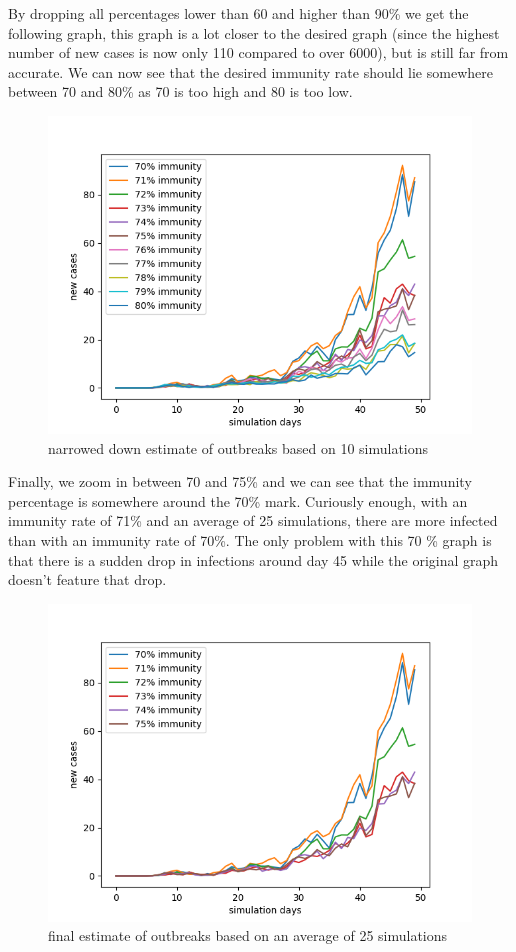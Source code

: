 \documentclass[runningheads]{llncs}
\begin{document}
	\newpage
	\noindent
	By dropping all percentages lower than 60 and higher than 90\% we get the following graph, this graph is a lot closer to the desired graph (since the highest number of new cases is now only 110 compared to over 6000), but is still far from accurate. We can now see that the desired immunity rate should lie somewhere between 70 and 80\% as 70 is too high and 80 is too low.
	\begin{figure}
		\includegraphics[width=\textwidth]{test_immunity_70-80.png}
		\caption{narrowed down estimate of outbreaks based on 10 simulations}
	\end{figure}
	
	\newpage
	\noindent
	Finally, we zoom in between 70 and 75\% and we can see that the immunity percentage is somewhere around the 70\% mark. Curiously enough, with an immunity rate of 71\% and an average of 25 simulations, there are more infected than with an immunity rate of 70\%. The only problem with this 70 \% graph is that there is a sudden drop in infections around day 45 while the original graph doesn't feature that drop.
	\begin{figure}
		\includegraphics[width=\textwidth]{test_immunity_70-75.png}
		\caption{final estimate of outbreaks based on an average of 25 simulations}
	\end{figure}
	\newpage
	
\end{document}
